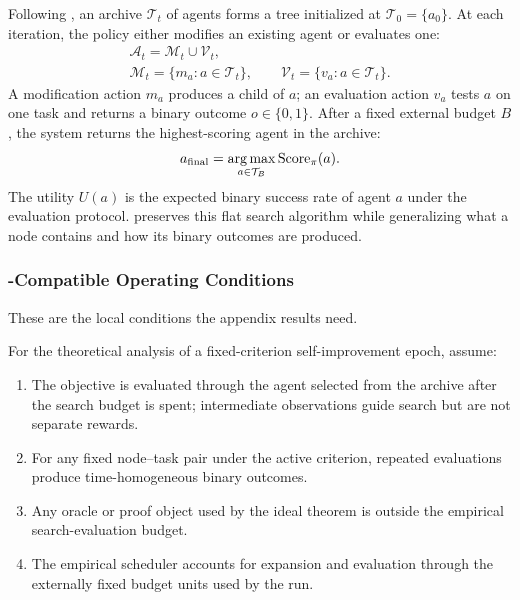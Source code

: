 Following \citet{wang2025huxley}, an archive $\mathcal{T}_t$ of agents forms a tree initialized at $\mathcal{T}_0=\{a_0\}$. At each iteration, the policy either modifies an existing agent or evaluates one:
\[
\begin{gathered}
\mathcal{A}_t = \mathcal{M}_t \cup \mathcal{V}_t,\\
\mathcal{M}_t = \{m_a : a \in \mathcal{T}_t\},
\qquad
\mathcal{V}_t = \{v_a : a \in \mathcal{T}_t\}.
\end{gathered}
\]
A modification action $m_a$ produces a child of $a$; an evaluation action $v_a$ tests $a$ on one task and returns a binary outcome $o\in\{0,1\}$. After a fixed external budget $B$, the system returns the highest-scoring agent in the archive:
\[
a_{\mathrm{final}}
=
\operatorname*{arg\,max}_{a\in\mathcal{T}_B}\operatorname{Score}_\pi(a).
\]
The utility $U(a)$ is the expected binary success rate of agent $a$ under the evaluation protocol. \ourmethod preserves this flat \hgm search algorithm while generalizing what a node contains and how its binary outcomes are produced.

\subsubsection{\texorpdfstring{\hgm}{HGM}-Compatible Operating Conditions}
\label{sec:prelim:assumptions}

These are the local conditions the appendix results need.

\begin{assumption}
\label{assumption:hgm}
For the theoretical analysis of a fixed-criterion self-improvement epoch, assume:
\begin{enumerate}[leftmargin=*,itemsep=0.2em,label=\textbf{C\arabic*.},ref=C\arabic*]
    \item \label{cond:final} The objective is evaluated through the agent selected from the archive after the search budget is spent; intermediate observations guide search but are not separate rewards.
    \item \label{cond:stationary} For any fixed node--task pair under the active criterion, repeated evaluations produce time-homogeneous binary outcomes.
    \item \label{cond:proofs} Any oracle or proof object used by the ideal \hgm theorem is outside the empirical search-evaluation budget.
    \item \label{cond:budget} The empirical scheduler accounts for expansion and evaluation through the externally fixed budget units used by the run.
\end{enumerate}
\end{assumption}

